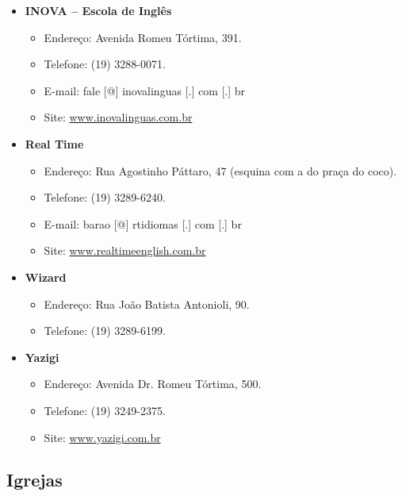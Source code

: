 \begin{itemize}
\item  \textbf{INOVA -- Escola de Inglês}
\begin{itemize}
\item  Endereço: Avenida Romeu Tórtima, 391.
\item  Telefone: (19) 3288-0071.
\item  E-mail: fale [@] inovalinguas [.] com [.] br
\item  Site: \url{www.inovalinguas.com.br}
\end{itemize}

\item  \textbf{Real Time}
\begin{itemize}
\item  Endereço: Rua Agostinho Páttaro, 47 (esquina com a do praça do coco).
\item  Telefone: (19) 3289-6240.
\item  E-mail: barao [@] rtidiomas [.] com [.] br
\item  Site: \url{www.realtimeenglish.com.br}
\end{itemize}

\item  \textbf{Wizard}
\begin{itemize}
\item  Endereço: Rua João Batista Antonioli, 90.
\item  Telefone: (19) 3289-6199.
\end{itemize}

\item  \textbf{Yazigi}
\begin{itemize}
\item  Endereço: Avenida Dr. Romeu Tórtima, 500.
\item  Telefone: (19) 3249-2375.
\item  Site: \url{www.yazigi.com.br}
\end{itemize}
\end{itemize}

\subsection{Igrejas}

